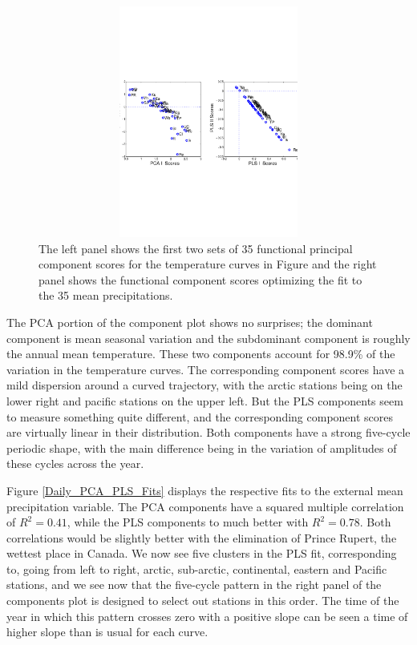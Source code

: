 \documentclass[12pt]{article}
\begin{document}
\begin{figure}
  \includegraphics[height=3in, width=6in]{figs/Daily_PCA_PLS_Scores}
  \caption{The left panel shows the first two sets of 35 functional principal component scores for the temperature curves in Figure \label{Temperature} and the right panel shows the functional component scores optimizing the fit to the 35 mean precipitations.}
  \label{Daily_PCA_PLS_Scores}
\end{figure}

The PCA portion of the component plot shows no surprises; the dominant component is mean seasonal variation and the subdominant component is roughly the annual mean temperature.  These two components account for 98.9\% of the variation in the temperature curves.  The corresponding component scores have a mild dispersion around a curved trajectory, with the arctic stations being on the lower right and pacific stations on the upper left. But the PLS components seem to measure something quite different, and the corresponding component scores are virtually linear in their distribution.  Both components have a strong five-cycle periodic shape, with the main difference being in the variation of amplitudes of these cycles across the year.

Figure \ref{Daily_PCA_PLS_Fits} displays the respective fits to the external mean precipitation variable.  The PCA components have a squared multiple correlation of $R^2 = 0.41$, while the PLS components to much better with $R^2 = 0.78.$  Both correlations would be slightly better with the elimination of Prince Rupert, the wettest place in Canada.  We now see five clusters in the PLS fit, corresponding to, going from left to right, arctic, sub-arctic, continental, eastern and Pacific stations, and we see now that the five-cycle pattern in the right panel of the components plot is designed to select out stations in this order.  The time of the year in which this pattern crosses zero with a positive slope can be seen a time of higher slope than is usual for each curve.
\end{document}

